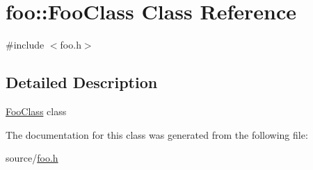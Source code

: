 \hypertarget{classfoo_1_1FooClass}{}\section{foo\+:\+:Foo\+Class Class Reference}
\label{classfoo_1_1FooClass}


{\ttfamily \#include $<$foo.\+h$>$}



\subsection{Detailed Description}
\hyperlink{classfoo_1_1FooClass}{Foo\+Class} class 

The documentation for this class was generated from the following file\+:\begin{DoxyCompactItemize}
\item 
source/\hyperlink{foo_8h}{foo.\+h}\end{DoxyCompactItemize}
